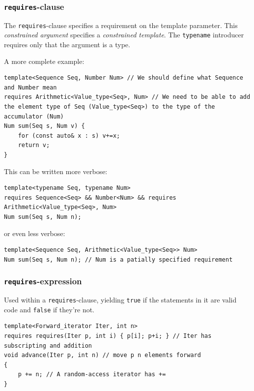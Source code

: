 \documentclass[table, xcdraw]{article}%
\begin{document}
\subsubsection{\texttt{requires}-clause}

The \texttt{requires}-clause specifies a requirement on the template parameter. This \textit{constrained argument} specifies a \textit{constrained template}. The \texttt{typename} introducer requires only that the argument is a type. 

A more complete example:

\begin{verbatim}
template<Sequence Seq, Number Num> // We should define what Sequence and Number mean
requires Arithmetic<Value_type<Seq>, Num> // We need to be able to add the element type of Seq (Value_type<Seq>) to the type of the accumulator (Num)
Num sum(Seq s, Num v) {
    for (const auto& x : s) v+=x;
    return v;
}
\end{verbatim}

This can be written more verbose:

\begin{verbatim}
template<typename Seq, typename Num>
requires Sequence<Seq> && Number<Num> && requires Arithmetic<Value_type<Seq>, Num>
Num sum(Seq s, Num n);
\end{verbatim}

or even less verbose:

\begin{verbatim}
template<Sequence Seq, Arithmetic<Value_type<Seq>> Num>
Num sum(Seq s, Num n); // Num is a patially specified requirement
\end{verbatim}

\subsubsection{\texttt{requires}-expression}

Used within a \texttt{requires}-clause, yielding \texttt{true} if the statements in it are valid code and \texttt{false} if they're not.

\begin{verbatim}
template<Forward_iterator Iter, int n>
requires requires(Iter p, int i) { p[i]; p+i; } // Iter has subscripting and addition
void advance(Iter p, int n) // move p n elements forward
{
    p += n; // A random-access iterator has +=
}
\end{verbatim}
\end{document}
